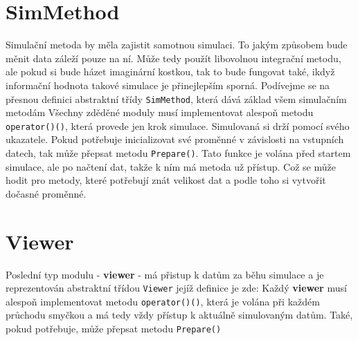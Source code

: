 \section{SimMethod}
Simulační metoda by měla zajistit samotnou simulaci. To jakým způsobem bude měnit data záleží pouze na ní. Může tedy použít libovolnou integrační metodu, ale pokud si bude házet imaginární kostkou, tak to bude fungovat také, ikdyž informační hodnota takové simulace je přinejlepším sporná. Podívejme se na přesnou definici abstraktní třídy \texttt{SimMethod}, která dává základ všem simulačním metodám
Všechny zděděné moduly musí implementovat alespoň metodu \texttt{operator()()}, která provede jen krok simulace. Simulovaná si drží pomocí svého ukazatele.
Pokud potřebuje inicializovat své proměnné v závislosti na vstupních datech, tak může přepsat metodu \texttt{Prepare()}. Tato funkce je volána před startem simulace, ale po načtení dat, takže k ním má metoda už přístup. Což se může hodit pro metody, které potřebují znát velikost dat a podle toho si vytvořit dočasné proměnné.
\section{Viewer}
Poslední typ modulu - \textbf{viewer} - má přistup k datům za běhu simulace a  je  reprezentován abstraktní třídou \texttt{Viewer} jejíž definice je zde:
Každý \textbf{viewer} musí alespoň implementovat metodu \texttt{operator()()}, která je volána při každém průchodu smyčkou a má tedy vždy přístup k aktuálně simulovaným datům. Také, pokud potřebuje, může přepsat metodu \texttt{Prepare()}
